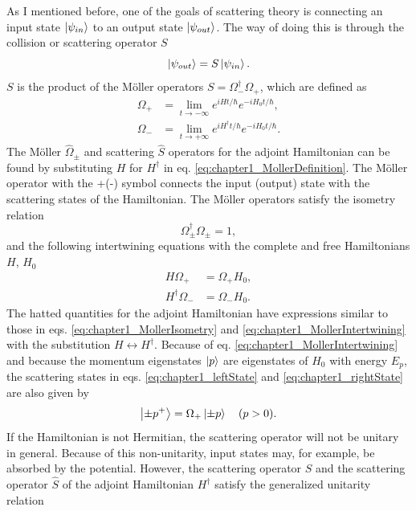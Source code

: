 As I mentioned before, one of the goals of scattering theory is connecting an input state $\ket{\psi_{in}}$ to an output state $\ket{\psi_{out}}$. The way of doing this is through the collision or scattering operator $S$
%
\begin{equation}
  \ket{\psi_{out}} = S \ket{\psi_{in}}
  \label{eq:chapter1_actuationOfSOperator}.
\end{equation}
%
$S$ is the product of the M\"{o}ller operators $S = \Omega_{-}^\dagger\Omega_{+}$, which are defined as
%
\begin{align}
    \Omega_+ &= \lim_{t \to -\infty}e^{i H t / \hbar}e^{-i H_0 t/ \hbar},\nonumber\\
    \Omega_- &= \lim_{t \to +\infty}e^{i H^\dagger t/ \hbar}e^{-i H_0 t/ \hbar}.
    \label{eq:chapter1_MollerDefinition}
\end{align}
%
The M\"{o}ller $\widehat{\Omega}_\pm$ and scattering $\widehat{S}$ operators for the adjoint Hamiltonian can be found by substituting $H$ for $H^\dagger$ in eq. \eqref{eq:chapter1_MollerDefinition}. The M\"{o}ller operator with the +(-) symbol connects the input (output) state with the scattering states of the Hamiltonian. The M\"{o}ller operators satisfy the isometry relation
%
\begin{equation}
  \Omega_\pm^\dagger \Omega_\pm = 1,
  \label{eq:chapter1_MollerIsometry}
\end{equation}
%
and the following intertwining equations with the complete and free Hamiltonians $H$, $H_0$
%
\begin{align}
  H\Omega_+ &= \Omega_+ H_0,\nonumber
  \\
  H^\dagger\Omega_- &= \Omega_- H_0.
  \label{eq:chapter1_MollerIntertwining}
\end{align}
%
The hatted quantities for the adjoint Hamiltonian have expressions similar to those in eqs. \eqref{eq:chapter1_MollerIsometry} and \eqref{eq:chapter1_MollerIntertwining} with the substitution $H\leftrightarrow H^\dagger$. Because of eq. \eqref{eq:chapter1_MollerIntertwining} and because the momentum eigenstates $\ket{p}$ are eigenstates of $H_0$ with energy $E_p$, the scattering states in eqs. \eqref{eq:chapter1_leftState} and \eqref{eq:chapter1_rightState} are also given by
%
\begin{equation}
  \ket{\pm p^+} = \Omega_+ \ket{\pm p}\quad (p>0).
  \label{eq:chapter1_scatteringStateFromMoller}
\end{equation}
%
%
If the Hamiltonian is not Hermitian, the scattering operator will not be unitary in general. Because of this non-unitarity, input states may, for example, be absorbed by the potential. However, the scattering operator $S$ and the scattering operator $\widehat{S}$ of the adjoint Hamiltonian $H^\dagger$ satisfy the generalized unitarity relation
